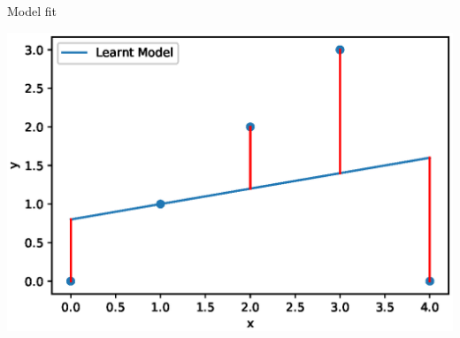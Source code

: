 \documentclass{beamer}
\begin{document}
\begin{frame}{Model fit}
    
       
    \begin{center}
        \includegraphics[totalheight=6cm]{linear-reg/linear-fit.eps}
    \end{center}



\end{frame}
    
        
            
\end{document}

